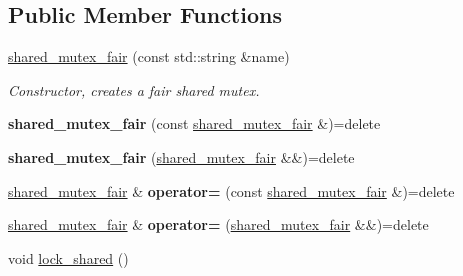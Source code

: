 \subsection*{Public Member Functions}
\begin{DoxyCompactItemize}
\item 
\hyperlink{classcpen333_1_1process_1_1impl_1_1shared__mutex__fair_a4a46bce7595b9f2a29067723f3b72b5e}{shared\+\_\+mutex\+\_\+fair} (const std\+::string \&name)
\begin{DoxyCompactList}\small\item\em Constructor, creates a fair shared mutex. \end{DoxyCompactList}\item 
\mbox{\label{classcpen333_1_1process_1_1impl_1_1shared__mutex__fair_a9660ca9c813290ded68578cf5175d966}} 
{\bfseries shared\+\_\+mutex\+\_\+fair} (const \hyperlink{classcpen333_1_1process_1_1impl_1_1shared__mutex__fair}{shared\+\_\+mutex\+\_\+fair} \&)=delete
\item 
\mbox{\label{classcpen333_1_1process_1_1impl_1_1shared__mutex__fair_a9b61874654e45ccff9ee06c841e6e0a4}} 
{\bfseries shared\+\_\+mutex\+\_\+fair} (\hyperlink{classcpen333_1_1process_1_1impl_1_1shared__mutex__fair}{shared\+\_\+mutex\+\_\+fair} \&\&)=delete
\item 
\mbox{\label{classcpen333_1_1process_1_1impl_1_1shared__mutex__fair_a68d7923baa7fe01d8109d61cb4fec8d9}} 
\hyperlink{classcpen333_1_1process_1_1impl_1_1shared__mutex__fair}{shared\+\_\+mutex\+\_\+fair} \& {\bfseries operator=} (const \hyperlink{classcpen333_1_1process_1_1impl_1_1shared__mutex__fair}{shared\+\_\+mutex\+\_\+fair} \&)=delete
\item 
\mbox{\label{classcpen333_1_1process_1_1impl_1_1shared__mutex__fair_a282afc005f687935cb75f9cea0dbbb81}} 
\hyperlink{classcpen333_1_1process_1_1impl_1_1shared__mutex__fair}{shared\+\_\+mutex\+\_\+fair} \& {\bfseries operator=} (\hyperlink{classcpen333_1_1process_1_1impl_1_1shared__mutex__fair}{shared\+\_\+mutex\+\_\+fair} \&\&)=delete
\item 
void \hyperlink{classcpen333_1_1process_1_1impl_1_1shared__mutex__fair_a11641159a61a83eda9713891f9f29159}{lock\+\_\+shared} ()

\end{DoxyCompactItemize}
